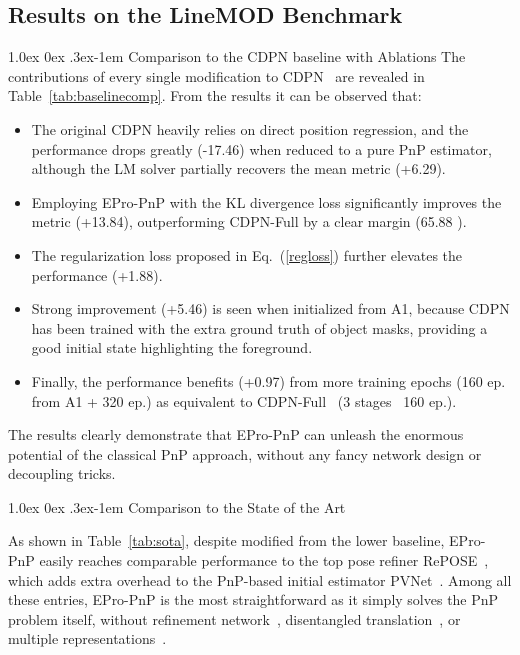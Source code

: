 \documentclass[10pt,twocolumn,letterpaper]{article}
\makeatletter
\renewcommand{\paragraph}{
  \@startsection{paragraph}{4}
  {\z@}{1.0ex \@plus 0ex \@minus .3ex}{-1em}
  {\normalfont\normalsize\bfseries}
}
\makeatother
\begin{document}
\subsection{Results on the LineMOD Benchmark}

\paragraph{Comparison to the CDPN baseline with Ablations}
The contributions of every single modification to CDPN~\cite{CDPN} are revealed in Table~\ref{tab:baselinecomp}. 
From the results it can be observed that:
\begin{itemize}[noitemsep,topsep=0.7ex,partopsep=0.7ex]
\item The original CDPN heavily relies on direct position regression, and the performance drops greatly (-17.46) when reduced to a pure PnP estimator, although the LM solver partially recovers the mean metric (+6.29). 
\item Employing EPro-PnP with the KL divergence loss significantly improves the metric (+13.84), outperforming CDPN-Full by a clear margin (65.88 ). 
\item The regularization loss proposed in Eq.~(\ref{regloss}) further elevates the performance (+1.88). 
\item Strong improvement (+5.46) is seen when initialized from A1, because CDPN has been trained with the extra ground truth of object masks, providing a good initial state highlighting the foreground.
\item Finally, the performance benefits (+0.97) from more training epochs (160 ep. from A1 + 320 ep.) as equivalent to CDPN-Full~\cite{CDPN} (3 stages \texttimes\ 160 ep.).
\end{itemize}
The results clearly demonstrate that EPro-PnP can unleash the enormous potential of the classical PnP approach, without any fancy network design or decoupling tricks. 

\paragraph{Comparison to the State of the Art}

As shown in Table~\ref{tab:sota}, despite modified from the lower baseline, EPro-PnP easily reaches comparable performance to the top pose refiner RePOSE~\cite{repose}, which adds extra overhead to the PnP-based initial estimator PVNet~\cite{pvnet}. Among all these entries, EPro-PnP is the most straightforward as it simply solves the PnP problem itself, without refinement network~\cite{repose, DPOD}, disentangled translation~\cite{CDPN,gdrnet}, or multiple representations~\cite{hybridpose}.
\end{document}
